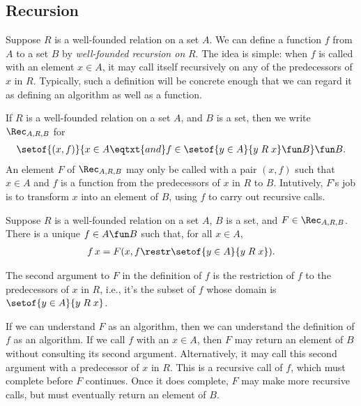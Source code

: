 %

\subsection{Recursion}

%
Suppose $R$ is a well-founded relation on a set $A$.  We can define a
function $f$ from $A$ to a set $B$ by \emph{well-founded recursion on}
$R$.  The idea is simple: when $f$ is called with an element $x\in A$,
it may call itself recursively on any of the predecessors of $x$ in
$R$.  Typically, such a definition will be concrete enough that we can
regard it as defining an algorithm as well as a function.

If $R$ is a well-founded relation on a set $A$, and $B$ is a set,
then we write $\Rec_{A,R,B}$ for
\begin{gather*}
\setof{(x,f)}{x\in A\eqtxt{and}f\in\setof{y\in A}{y\mathrel{R}x}\fun B}
\fun B .
\end{gather*}
An element $F$ of $\Rec_{A,R,B}$ may only be called with a pair
$(x,f)$ such that $x\in A$ and $f$ is a function from the predecessors
of $x$ in $R$ to $B$.  Intutively, $F$'s job is to transform $x$
into an element of $B$, using $f$ to carry out recursive calls.

\begin{theorem}
\label{WellFoundedRecursion}
Suppose $R$ is a well-founded relation on a set $A$, $B$ is
a set, and $F\in\Rec_{A,R,B}$.  There is a unique $f\in A\fun B$
such that, for all $x\in A$,
\begin{gather*}
f\,x = F(x, f\restr\setof{y\in A}{y\mathrel{R}x}) .
\end{gather*}
\end{theorem}
 
The second argument to $F$ in the definition of $f$ is the restriction
of $f$ to the predecessors of $x$ in $R$, i.e., it's the subset of
$f$ whose domain is $\setof{y\in A}{y\mathrel{R}x}$.

If we can understand $F$ as an algorithm, then we can understand the
definition of $f$ as an algorithm.  If we call $f$ with an $x\in A$,
then $F$ may return an element of $B$ without consulting its second
argument.  Alternatively, it may call this second argument with a
predecessor of $x$ in $R$.  This is a recursive call of $f$, which must
complete before $F$ continues.  Once it does complete, $F$ may make
more recursive calls, but must eventually return an element of $B$.

